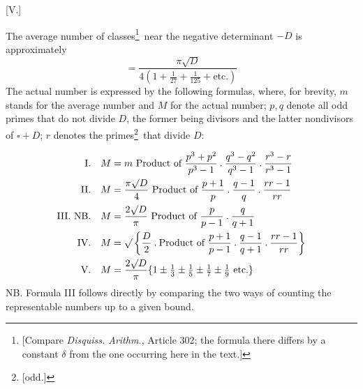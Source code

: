 \par\bigskip{}\centerline{[V.]}\medskip
The average number of classes\begingroup\renewcommand{\thefootnote}{*)}\footnote{[Compare \emph{Disquiss. Arithm.}, Article 302; the formula there differs by a constant $\delta$ from the one occurring here in the text.]}\endgroup\ near the negative determinant $-D$ is approximately
\[
=\frac{\pi\surd D}{4(1+\tfrac1{27}+\tfrac1{125}+\text{etc.})}
\]
The actual number is expressed by the following formulas, where, for brevity, $m$ stands for the average number and $M$ for the actual number; $p,q$ denote all odd primes that do not divide $D$, the former being divisors and the latter nondivisors of $\square+D$; $r$ denotes the primes\begingroup\renewcommand{\thefootnote}{**)}\footnote{[odd.]}\endgroup\ that divide $D$:

\[
\begin{aligned}
\text{I.}\quad M&=m\ \text{Product of }\frac{p^3+p^2}{p^3-1}\mathbin{.}\frac{q^3-q^2}{q^3-1}\mathbin{.}\frac{r^3-r}{r^3-1}\\
\text{II.}\quad M&=\frac{\pi\surd D}4\ \text{Product of }\frac{p+1}p\mathbin{.}\frac{q-1}q\mathbin{.}\frac{rr-1}{rr}\\
\text{III. NB.}\quad M&=\frac{2\surd D}\pi\ \text{Product of }\frac p{p-1}\mathbin{.}\frac q{q+1}\\
\text{IV.}\quad M&=\surd\left\{\frac D2\mathbin{.}\text{Product of }\frac{p+1}{p-1}\mathbin{.}\frac{q-1}{q+1}\mathbin{.}\frac{rr-1}{rr}\right\}\\
\text{V.}\quad M&=\frac{2\surd D}\pi\{1\pm\tfrac13\pm\tfrac15\pm\tfrac17\pm\tfrac19\text{ etc.}\}
\end{aligned}
\]
NB. Formula III follows directly by comparing the two ways of counting the representable numbers up to a given bound.
